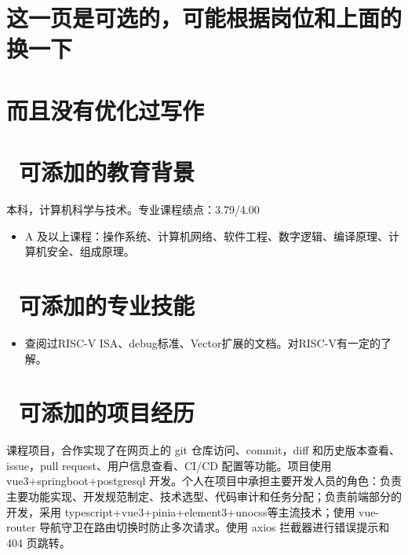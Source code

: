 \newpage

\section{这一页是可选的，可能根据岗位和上面的换一下}

\vspace{0.5cm}

\section{而且没有优化过写作}

\vspace{1cm}

\section{\faGraduationCap\  可添加的教育背景}
本科，计算机科学与技术。专业课程绩点：3.79/4.00
\begin{itemize}[parsep=0.5ex]
  \item A 及以上课程：操作系统、计算机网络、软件工程、数字逻辑、编译原理、计算机安全、组成原理。
\end{itemize}

\section{\faBook\ 可添加的专业技能}
\begin{itemize}[parsep=0.5ex]
    \item 查阅过RISC-V ISA、debug标准、Vector扩展的文档。对RISC-V有一定的了解。
\end{itemize}

\section{\faCogs\ 可添加的项目经历}


\begin{spacing}{1.125}
  课程项目，合作实现了在网页上的 git 仓库访问、commit，diff 和历史版本查看、issue，pull request、用户信息查看、CI/CD 配置等功能。项目使用 vue3+springboot+postgresql 开发。个人在项目中承担主要开发人员的角色：负责主要功能实现、开发规范制定、技术选型、代码审计和任务分配；负责前端部分的开发，采用 typescript+vue3+pinia+element3+unocss等主流技术；使用 vue-router 导航守卫在路由切换时防止多次请求。使用 axios 拦截器进行错误提示和 404 页跳转。
  \end{spacing}

